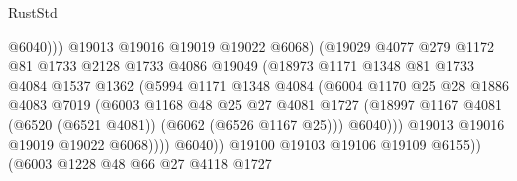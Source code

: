 \begin{lexlean}{RustStd}
\begin{coremodule}
                                      @6040)))
                                @19013
                                @19016
                                @19019
                                @19022
                                @6068)
                              (@19029
                                @4077
                                @279
                                @1172
                                @81
                                @1733
                                @2128
                                @1733
                                @4086
                                @19049
                                (@18973
                                  @1171
                                  @1348
                                  @81
                                  @1733
                                  @4084
                                  @1537
                                  @1362
                                  (@5994
                                    @1171
                                    @1348
                                    @4084
                                    (@6004
                                      @1170
                                      @25
                                      @28
                                      @1886
                                      @4083
                                      @7019
                                      (@6003
                                        @1168
                                        @48
                                        @25
                                        @27
                                        @4081
                                        @1727
                                        (@18997
                                          @1167
                                          @4081
                                          (@6520 (@6521 @4081))
                                          (@6062 (@6526 @1167 @25)))
                                        @6040)))
                                  @19013
                                  @19016
                                  @19019
                                  @19022
                                  @6068))))
                          @6040))
                      @19100
                      @19103
                      @19106
                      @19109
                      @6155))
                  (@6003
                    @1228
                    @48
                    @66
                    @27
                    @4118
                    @1727

\end{coremodule}
\end{lexlean}

